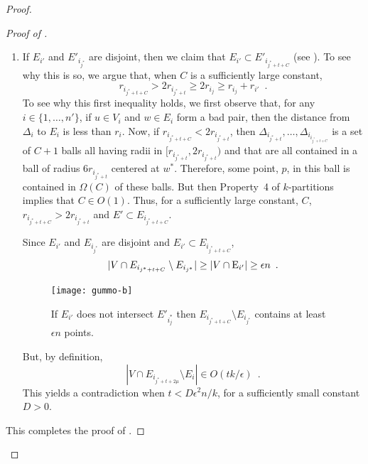 \documentclass{patmorin}
\begin{document}
\begin{proof}
\begin{proof}[Proof of ]
\begin{enumerate}
    \item If $E_{i'}$ and $E'_{i_{j^*}}$ are disjoint, then we claim that
    $E_{i'}\subset E'_{i_{j^*+t+C}}$ (see ).  To see why
    this is so, we argue that, when $C$ is a sufficiently large constant,
    \[
      r_{i_{j^*+t+C}} > 2r_{i_{j^*+t}} 
          \ge 2r_{i_j} \ge r_{i_j} + r_{i'} \enspace .
    \]  
    To see why this first inequality holds, we first observe
    that, for any $i\in\{1,\ldots,n'\}$, if $u\in V_i$ and $w\in E_i$
    form a bad pair, then the distance from $\Delta_i$ to $E_i$ is less
    than $r_i$.  Now, if $r_{i_{j^*+t+C}} < 2r_{i_{j^*+t}}$,
    then $\Delta_{i_{j^*+t}},\ldots,\Delta_{i_{i_{j^*+t+C}}}$ is a set
    of $C+1$ balls all having radii in $[r_{i_{j^*+t}},2r_{i_{j^*+t}})$ and
    that are all contained in a ball of radius $6r_{i_{j^*+t}}$ centered
    at $w^*$.  Therefore, some point, $p$, in this ball is contained in
    $\Omega(C)$ of these balls.  But then Property~4 of $k$-partitions
    implies that $C\in O(1)$.  Thus, for a sufficiently large constant, $C$,
    $r_{i_{j^*+t+C}} > 2r_{i_{j^*+t}}$ and $E'\subset E_{i_{j^*+t+C}}$.

    Since $E_{i'}$ and $E_{i_{j^*}}$ are disjoint and $E_{i'}\subset
    E_{i_{j^*+t+C}}$,
    \[
      |V\cap E_{i_{j^*+t+C}}\setminus E_{i_{j^*}}| 
         \ge |V\cap\mathrm{E}_{i'}| \ge \epsilon n \enspace .
    \]
    \begin{figure}
      \begin{center}
        \texttt{[image: gummo-b]}
        \caption{If $E_{i'}$ does not intersect $E'_{i_j^*}$ then
          $E_{i_{j^*+t+C}}\setminus E_{i_{j^*}}$ contains at least
          $\epsilon n$ points.}
      \end{center}
    \end{figure}
    But, by definition, 
    \[
      |V\cap E_{i_{j^*+t+2\mu}}\setminus E_i| 
         \in O(tk/\epsilon) \enspace .
    \]
    This yields a contradiction when $t<D \epsilon^2 n/k$, for a
    sufficiently small constant $D>0$.
  \end{enumerate}
  This completes the proof of .
  \end{proof}



\end{proof}
\end{document}
